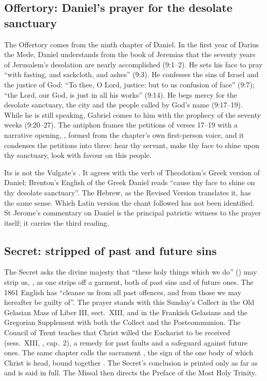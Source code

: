 \subsection{Offertory: Daniel's prayer for the desolate sanctuary}

The Offertory comes from the ninth chapter of Daniel. In the first year of
Darius the Mede, Daniel understands from the book of Jeremias that the seventy
years of Jerusalem's desolation are nearly accomplished (9:1--2). He sets his
face to pray ``with fasting, and sackcloth, and ashes'' (9:3). He confesses the
sins of Israel and the justice of God: ``To thee, O Lord, justice: but to us
confusion of face'' (9:7); ``the Lord, our God, is just in all his works''
(9:14). He begs mercy for the desolate sanctuary, the city and the people
called by God's name (9:17--19). While he is still speaking, Gabriel comes to
him with the prophecy of the seventy weeks (9:20--27). The antiphon frames the
petitions of verses 17--19 with a narrative opening, , formed from the chapter's own first-person voice, and it
condenses the petitions into three: hear thy servant, make thy face to shine
upon thy sanctuary, look with favour on this people.

Its  is not the Vulgate's . It
agrees with the verb of Theodotion's Greek version of Daniel; Brenton's English
of the Greek Daniel reads ``cause thy face to shine on thy desolate
sanctuary''. The Hebrew, as the Revised Version translates it, has the same
sense. Which Latin version the chant followed has not been identified. St Jerome's
commentary on Daniel is the principal patristic witness to the prayer itself;
it carries the third reading.

\subsection{Secret: stripped of past and future sins}

The Secret asks the divine majesty that ``these holy things which we do''
() may strip us, , as one strips
off a garment, both of past sins and of future ones. The 1861 English has
``cleanse us from all past offences, and from those we may hereafter be guilty
of''. The prayer stands with this Sunday's Collect in the Old Gelasian Mass of
Liber III, sect.~XIII, and in the Frankish Gelasians and the Gregorian
Supplement with both the Collect and the Postcommunion. The Council of Trent
teaches that Christ willed the Eucharist to be received  (sess.~XIII, , cap.~2), a
remedy for past faults and a safeguard against future ones. The same chapter
calls the sacrament , the sign of the one body of which Christ is head, bound together
. The Secret's conclusion
is printed only as far as  and is said in full. The Missal
then directs the Preface of the Most Holy Trinity.


